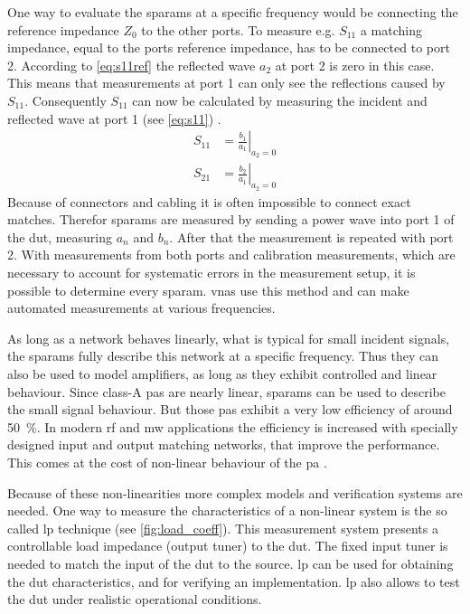 \documentclass[12pt,a4paper,parskip=full,abstract=true,BCOR=10mm,twoside,open=right]{scrreprt}
\begin{document}
One way to evaluate the \glspl{sparam} at a specific frequency would be connecting
the reference impedance $Z_0$ to the other ports. To measure e.g. $S_{11}$ a matching impedance, equal to the ports reference impedance, has to
be connected to port 2. According to \cref{eq:s11ref} the reflected wave $a_2$
at port 2 is zero in this case. This means that measurements at port 1 can only see the
reflections caused by $S_{11}$. Consequently $S_{11}$ can now be calculated by measuring the incident
and reflected wave at port 1 (see \cref{eq:s11}) \cite{agilent_an_154}.
\begin{align}
    \label{eq:s11} S_{11} & = \left.\frac{b_1}{a_1} \right\rvert_{a_2 = 0}\\
    \label{eq:s21} S_{21} & = \left.\frac{b_2}{a_1} \right\rvert_{a_2 = 0}
\end{align}
Because of connectors and cabling it is often impossible to connect exact matches. Therefor
\glspl{sparam} are measured by sending a power wave into port 1 of the \gls{dut}, measuring
$a_n$ and $b_n$. After that the measurement is repeated with port 2. With measurements from
both ports and calibration measurements, which are necessary to account for systematic errors in the measurement setup,
it is possible to determine every \gls{sparam}. \Glspl{vna} use this method
and can make automated measurements at various frequencies.

As long as a network behaves linearly, what is typical for small incident signals, the \glspl{sparam}
fully describe this network at a specific frequency. Thus they can also be used
to model amplifiers, as long as they exhibit controlled and linear behaviour. Since
class-A \glspl{pa} are nearly linear, \glspl{sparam} can be used to describe the small
signal behaviour. But those \glspl{pa} exhibit a very low efficiency of around \SI{50}{\percent}.
In modern \gls{rf} and \gls{mw} applications the efficiency is increased with specially designed input and
output matching networks, that improve the performance. This comes at the cost of non-linear
behaviour of the \gls{pa} \cite{ghannouchi_load-pull_2013}.

Because of these non-linearities more complex models and verification systems are
needed. One way to measure the characteristics of a non-linear system is the so called
\gls{lp} technique (see \cref{fig:load_coeff}). This measurement system presents a
controllable load impedance (output tuner) to the \gls{dut}. The fixed input tuner is
needed to match the input of the \gls{dut} to the source. \Gls{lp} can be used for obtaining the
\gls{dut} characteristics, and for verifying an implementation. \Gls{lp} also
allows to test the \gls{dut} under realistic operational conditions.
\end{document}

